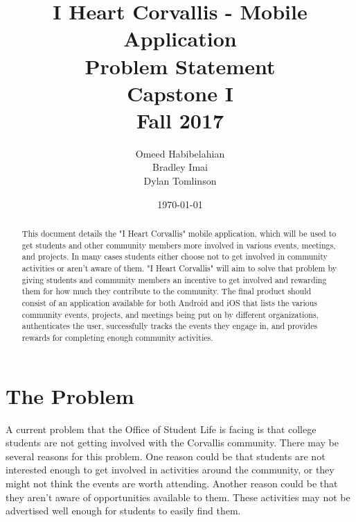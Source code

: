 \documentclass[draftclsnofoot, onecolumn, 10pt, compsoc]{IEEEtran}
\title{\textbf{I Heart Corvallis - Mobile Application\\Problem Statement}\\Capstone I\\Fall 2017}
\author{Omeed Habibelahian\\Bradley Imai\\Dylan Tomlinson}
\date{\today}
\begin{document}
	\maketitle
	\begin{abstract}
		This document details the "I Heart Corvallis" mobile application, which will be used to get students and other 
		community members more involved in various events, meetings, and projects. In many cases students either choose 
		not to get involved in community activities or aren't aware of them. "I Heart Corvallis" will aim to solve that problem by 
		giving students and community members an incentive to get involved and rewarding them for how much they 
		contribute to the community. The final product should consist of an application available for both Android and iOS that 
		lists the various community events, projects, and meetings being put on by different organizations, authenticates the 
		user, successfully tracks the events they engage in, and provides rewards for completing enough community activities.
	\end{abstract}
	\newpage
	
	\section{The Problem}
		A current problem that the Office of Student Life is facing is that college students are not getting involved with the 
		Corvallis community. There may be several reasons for this problem. One reason could be that students are not 
		interested enough to get involved in activities around the community, or they might not think the events are worth 
		attending. Another reason could be that they aren't aware of opportunities available to them. These activities may not 
		be advertised well enough for students to easily find them. 
	
\end{document}
